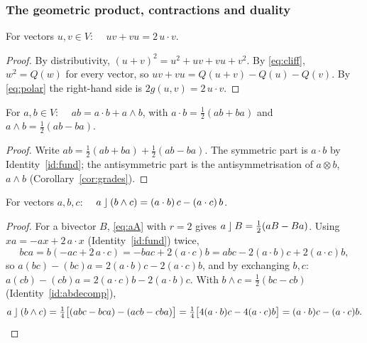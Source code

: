 \subsubsection*{The geometric product, contractions and duality}

\begin{identity}\label{id:fund}
For vectors $u,v\in V$: $\quad uv+vu=2\,u\cdot v$.
\end{identity}
\begin{proof}
 By distributivity, $(u+v)^2=u^2+uv+vu+v^2$.
 By \eqref{eq:cliff}, $w^2=Q(w)$ for every vector, so $uv+vu=Q(u+v)-Q(u)-Q(v)$.
 By \eqref{eq:polar} the right-hand side is $2g(u,v)=2\,u\cdot v$.
\end{proof}

\begin{identity}\label{id:abdecomp}
For $a,b\in V$: $\quad ab=a\cdot b+a\wedge b$, with $a\cdot b=\frac12(ab+ba)$ and $a\wedge b=\frac12(ab-ba)$.
\end{identity}
\begin{proof}
Write $ab=\frac12(ab+ba)+\frac12(ab-ba)$. The symmetric part is $a\cdot b$ by Identity~\ref{id:fund}; the antisymmetric part
is the antisymmetrisation of $a\otimes b$, \ie $a\wedge b$ (Corollary~\ref{cor:grades}).
\end{proof}

\begin{identity}[contraction of a vector with a bivector; Proposition~\ref{prop:contr}(1), $k=2$]\label{id:lcwedge}
For vectors $a,b,c$: $\quad a\mathbin{\rfloor}(b\wedge c)=(a\cdot b)\,c-(a\cdot c)\,b$.
\end{identity}
\begin{proof}
 For a bivector $B$, \eqref{eq:aA} with $r=2$ gives $a\mathbin{\rfloor} B=\frac12(aB-Ba)$.
 Using $xa=-ax+2\,a\cdot x$ (Identity~\ref{id:fund}) twice,
\[
bca=b(-ac+2\,a\cdot c)=-bac+2(a\cdot c)b=abc-2(a\cdot b)c+2(a\cdot c)b,
\]
so $a(bc)-(bc)a=2(a\cdot b)c-2(a\cdot c)b$, and by exchanging $b,c$: $a(cb)-(cb)a=2(a\cdot c)b-2(a\cdot b)c$.
 With $b\wedge c=\frac12(bc-cb)$ (Identity~\ref{id:abdecomp}),
\[
a\mathbin{\rfloor}(b\wedge c)=\tfrac14\bigl[(abc-bca)-(acb-cba)\bigr]=\tfrac14\bigl[4(a\cdot b)c-4(a\cdot c)b\bigr]=(a\cdot b)c-(a\cdot c)b .
\]
\end{proof}

